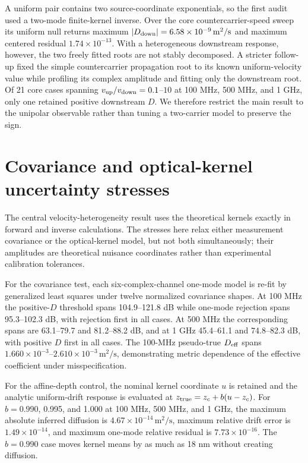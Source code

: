 \documentclass[aps,pra,onecolumn,superscriptaddress,nofootinbib]{revtex4-2}
\begin{document}
A uniform pair contains two source-coordinate exponentials, so the first audit used a two-mode finite-kernel inverse. Over the core countercarrier-speed sweep its uniform null returns maximum $|D_{\rm down}|=6.58\times10^{-9}\,\mathrm{m^2/s}$ and maximum centered residual $1.74\times10^{-13}$. With a heterogeneous downstream response, however, the two freely fitted roots are not stably decomposed. A stricter follow-up fixed the simple countercarrier propagation root to its known uniform-velocity value while profiling its complex amplitude and fitting only the downstream root. Of 21 core cases spanning $v_{\rm up}/v_{\rm down}=0.1$--$10$ at 100 MHz, 500 MHz, and 1 GHz, only one retained positive downstream $D$. We therefore restrict the main result to the unipolar observable rather than tuning a two-carrier model to preserve the sign.

\section{Covariance and optical-kernel uncertainty stresses}

The central velocity-heterogeneity result uses the theoretical kernels exactly in forward and inverse calculations. The stresses here relax either measurement covariance or the optical-kernel model, but not both simultaneously; their amplitudes are theoretical nuisance coordinates rather than experimental calibration tolerances.

For the covariance test, each six-complex-channel one-mode model is re-fit by generalized least squares under twelve normalized covariance shapes. At 100 MHz the positive-$D$ threshold spans 104.9--121.8 dB while one-mode rejection spans 95.3--102.3 dB, with rejection first in all cases. At 500 MHz the corresponding spans are 63.1--79.7 and 81.2--88.2 dB, and at 1 GHz 45.4--61.1 and 74.8--82.3 dB, with positive $D$ first in all cases. The 100-MHz pseudo-true $D_{\rm eff}$ spans $1.660\times10^{-3}$--$2.610\times10^{-3}\,\mathrm{m^2/s}$, demonstrating metric dependence of the effective coefficient under misspecification.

For the affine-depth control, the nominal kernel coordinate $u$ is retained and the analytic uniform-drift response is evaluated at $z_{\rm true}=z_c+b(u-z_c)$. For $b=0.990$, 0.995, and 1.000 at 100 MHz, 500 MHz, and 1 GHz, the maximum absolute inferred diffusion is $4.67\times10^{-14}\,\mathrm{m^2/s}$, maximum relative drift error is $1.49\times10^{-14}$, and maximum one-mode relative residual is $7.73\times10^{-16}$. The $b=0.990$ case moves kernel means by as much as 18 nm without creating diffusion.
\end{document}

